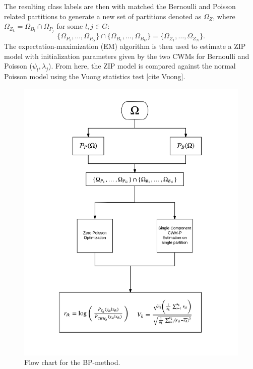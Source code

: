 \documentclass[11pt,letterpaper]{article}
\numberwithin{equation}{section}
\numberwithin{equation}{section}
\numberwithin{equation}{section}
\begin{document}
 The resulting class labels are then with matched the Bernoulli and Poisson related partitions to generate a new set of partitions denoted as $ \Omega_Z$, where $ \Omega_{Z_k} = \Omega_{B_l} \cap \Omega_{P_j}  $ for some $ l, j \in G$:
$$\{  \Omega_{P_1}, \ldots, \Omega_{P_G} \} \cap  \{  \Omega_{B_1}, \ldots, \Omega_{B_G} \}  =  \{  \Omega_{Z_1}, \ldots, \Omega_{Z_N} \}.$$
The expectation-maximization (EM) algorithm \citep{Dempster+Laird+Rubin:1977} is then used to estimate a ZIP model with initialization parameters given by the two CWMs for Bernoulli and Poisson ($ \psi_l,\lambda_j  $). From here, the ZIP model is compared against the normal Poisson model using the Vuong statistics test [cite Vuong]. %
\begin{figure}[!htb]
\begin{center}
\includegraphics[scale=0.68]{BPmethod.png}%
\caption{Flow chart for the BP-method.}
\end{center}
\end{figure}
\end{document}
